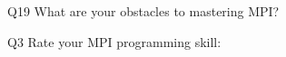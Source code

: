 \begin{description}%
\item{Q19} What are your obstacles to mastering MPI?%
\item{Q3} Rate your MPI programming skill:%
\end{description}%
